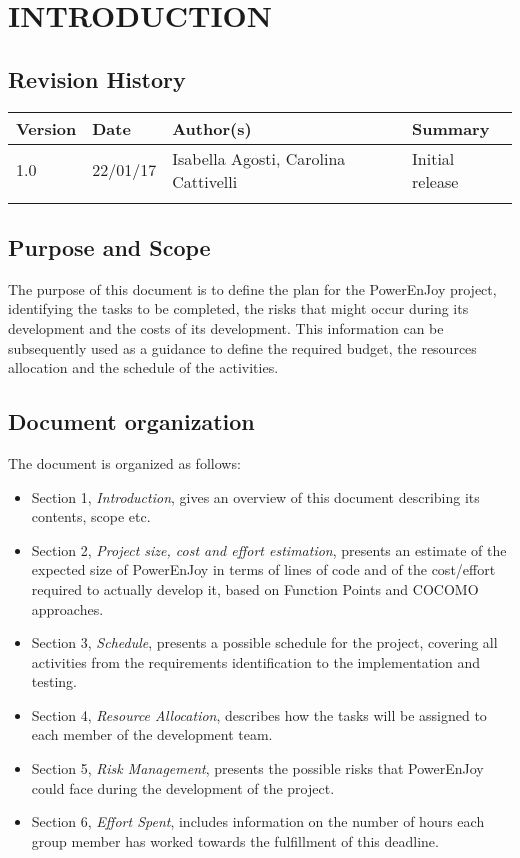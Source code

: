 \section{INTRODUCTION}

\subsection{Revision History}
\begin{table}[h]
	\centering
	\begin{tabular}{| m{1.5cm} | m{1.6cm} | m{6.4cm} | m{2.5cm} |}
		\hline
		\textbf{Version} & \textbf{Date} & \textbf{Author(s)} & \textbf{Summary}\\
		\hline
		1.0 & 22/01/17 & Isabella Agosti, Carolina Cattivelli & Initial release\\
		\hline
		&&&\\
		\hline
	\end{tabular}
\end{table}

\subsection{Purpose and Scope}
The purpose of this document is to define the plan for the PowerEnJoy project, identifying the tasks to be completed, the risks that might occur during its development and the costs of its development. This information can be subsequently used as a guidance to define the required budget, the resources allocation and the schedule of the activities.

\subsection{Document organization}
The document is organized as follows:
\begin{itemize}
	\item Section 1, \textit{Introduction}, gives an overview of this document describing its contents, scope etc.
	\item Section 2, \textit{Project size, cost and effort estimation}, presents an estimate of the expected size of PowerEnJoy in terms of lines of code and of the cost/effort required to actually develop it, based on Function Points and COCOMO approaches.
	\item Section 3, \textit{Schedule}, presents a possible schedule for the project, covering all activities from the requirements identification to the implementation and testing.
	\item Section 4, \textit{Resource Allocation}, describes how the tasks will be assigned to each member of the development team.
	\item Section 5, \textit{Risk Management}, presents the possible risks that PowerEnJoy could face during the development of the project.
	\item Section 6, \textit{Effort Spent}, includes information on the number of hours each group member has worked towards the fulfillment of this deadline. 
\end{itemize}

